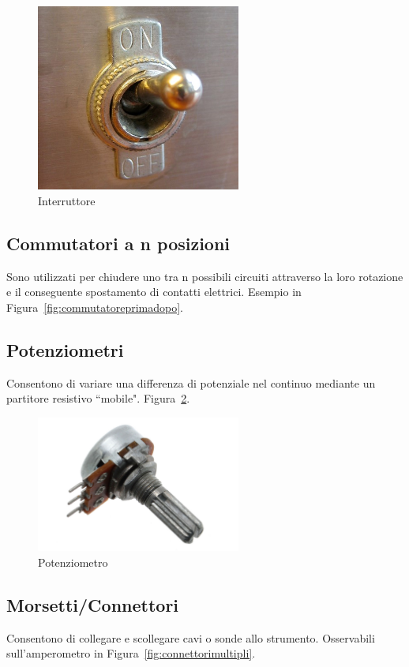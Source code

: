 \documentclass[12pt,a4paper]{report}
\begin{document}
\begin{figure}[h]
  \centering
  \includegraphics[width=0.6\textwidth]{switch}
  \caption{Interruttore \cite{wiki:switch}}
  \label{fig:switch}
\end{figure}


\subsection{Commutatori a n posizioni}
Sono utilizzati per chiudere uno tra n possibili circuiti attraverso la loro rotazione e il conseguente spostamento di contatti elettrici.
Esempio in Figura~\ref{fig:commutatoreprimadopo}.
\subsection{Potenziometri}
Consentono di variare una differenza di potenziale nel continuo mediante un partitore resistivo ``mobile". Figura~\ref{fig:10kpot}.

\begin{figure}[h]
  \centering
  \includegraphics[width=0.6\textwidth]{10kpot}
  \caption{Potenziometro \cite{wiki:10kpot}}
  \label{fig:10kpot}
\end{figure}

\subsection{Morsetti/Connettori}
Consentono di collegare e scollegare cavi o sonde allo strumento. Osservabili sull'amperometro in Figura~\ref{fig:connettorimultipli}.
\end{document}
